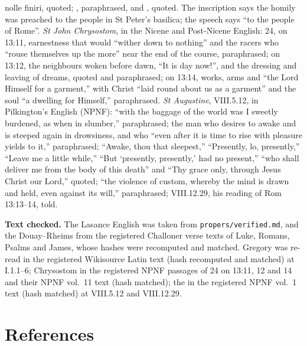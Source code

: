{{nolle finiri}, quoted; , paraphrased, and , quoted. The inscription says
the homily was preached to the people in St Peter's basilica; the speech says
``to the people of Rome''. \emph{St John Chrysostom}, in the Nicene and
Post-Nicene English:  24, on 13:11, earnestness that
would ``wither down to nothing'' and the racers who ``rouse themselves up the
more'' near the end of the course, paraphrased; on 13:12, the neighbours woken
before dawn, ``It is day now!'', and the dressing and leaving of dreams,
quoted and paraphrased; on 13:14, works, arms and ``the Lord Himself for a
garment,'' with Christ ``laid round about us as a garment'' and the soul ``a
dwelling for Himself,'' paraphrased. \emph{St Augustine}, 
VIII.5.12, in Pilkington's English (NPNF): ``with the baggage of the world was
I sweetly burdened, as when in slumber,'' paraphrased; the man who desires to
awake and is steeped again in drowsiness, and who ``even after it is time to
rise with pleasure yields to it,'' paraphrased; ``Awake, thou that sleepest,''
``Presently, lo, presently,'' ``Leave me a little while,'' ``But `presently,
presently,' had no present,'' ``who shall deliver me from the body of this
death'' and ``Thy grace only, through Jesus Christ our Lord,'' quoted; ``the
violence of custom, whereby the mind is drawn and held, even against its
will,'' paraphrased; VIII.12.29, his reading of Rom 13:13--14, told.

\textbf{Text checked.} The Lasance English was taken from
\texttt{propers/verified.md}, and the Douay--Rheims from the registered
Challoner verse texts of Luke, Romans, Psalms and James, whose hashes were
recomputed and matched. Gregory was re-read in the registered Wikisource Latin
text (hash recomputed and matched) at I.1.1--6; Chrysostom in the registered
NPNF passages of  24 on 13:11, 12 and 14 and their
NPNF vol.~11 text (hash matched); the  in the registered
NPNF vol.~1 text (hash matched) at VIII.5.12 and VIII.12.29.

\par}

\section*{References}

